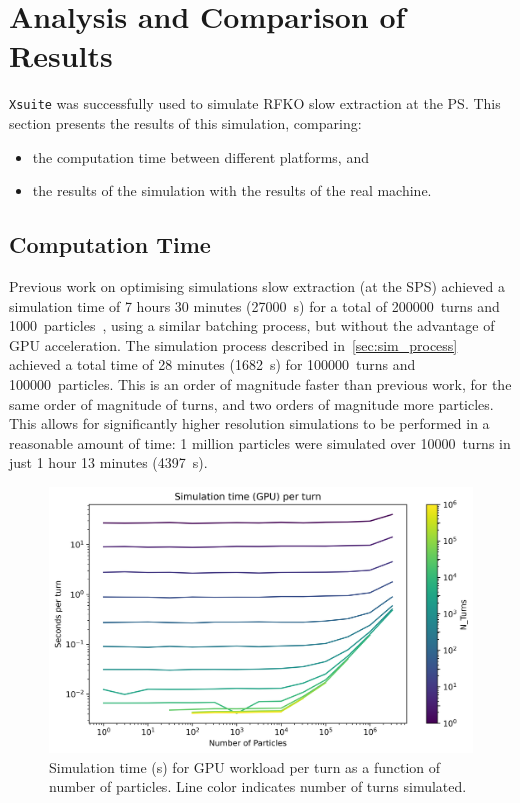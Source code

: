 \documentclass[11pt]{report}
\begin{document}
\chapter{Analysis and Comparison of Results}

\verb|Xsuite| was successfully used to simulate RFKO slow extraction at the PS. This section presents the results of this simulation, comparing:
\begin{itemize}
  \item the computation time between different platforms, and
  \item the results of the simulation with the results of the real machine.
\end{itemize}


\section{Computation Time}

Previous work on optimising simulations slow extraction (at the SPS) achieved a simulation time of 7 hours 30 minutes (\qty{27000}{\second}) for a total of \qty{200000}{turns} and \qty{1000}{particles}~\cite[Figure 3]{Schicho:2039579}, using a similar batching process, but without the advantage of GPU acceleration. The simulation process described in~\autoref{sec:sim_process} achieved a total time of 28 minutes (\qty{1682}{\second}) for \qty{100000}{turns} and \qty{100000}{particles}. This is an order of magnitude faster than previous work, for the same order of magnitude of turns, and two orders of magnitude more particles. This allows for significantly higher resolution simulations to be performed in a reasonable amount of time: 1 million particles were simulated over \qty{10000}{turns} in just 1 hour 13 minutes (\qty{4397}{\second}).

\begin{figure}[h]
  \centering
  \includegraphics*[width=0.7\linewidth]{GPU_graph_per_turn.png}
  \caption{Simulation time (s) for GPU workload per turn as a function of number of particles. Line color indicates number of turns simulated.}\label{fig:gpu_graph_per_turn}
\end{figure}
\end{document}
